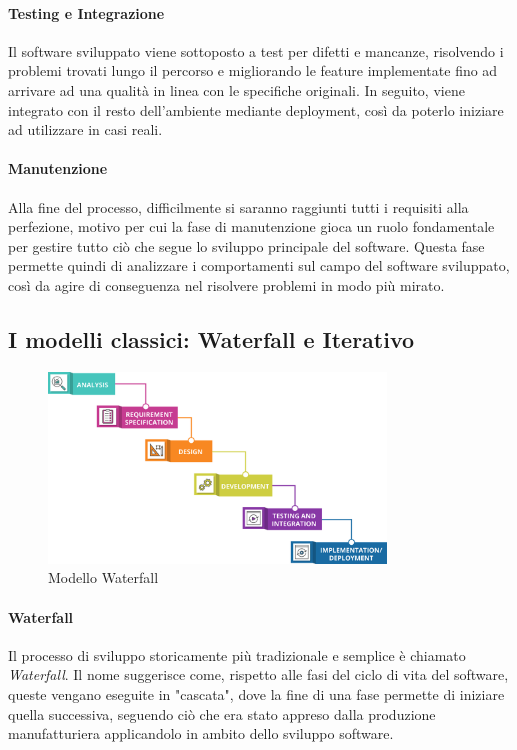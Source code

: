 \documentclass[a4paper,12pt]{report}
\begin{document}
				\paragraph{Testing e Integrazione}
				Il software sviluppato viene sottoposto a test per difetti e mancanze, risolvendo i problemi trovati lungo il percorso e migliorando
				le feature implementate fino ad arrivare ad una qualità in linea con le specifiche originali.
				In seguito, viene integrato con il resto dell'ambiente mediante deployment, così da poterlo iniziare ad utilizzare in casi reali.
				
				\paragraph{Manutenzione}
				Alla fine del processo, difficilmente si saranno raggiunti tutti i requisiti alla perfezione, motivo per cui la fase di manutenzione
				gioca un ruolo fondamentale per gestire tutto ciò che segue lo sviluppo principale del software. Questa fase permette quindi di analizzare
				i comportamenti sul campo del software sviluppato, così da agire di conseguenza nel risolvere problemi in modo più mirato.
	
			\subsection{I modelli classici: Waterfall e Iterativo}
			
				\begin{figure}[h]
					\centering
					\includegraphics[width=0.8\textwidth]{waterfall}
					\caption{Modello Waterfall}
					\label{fig:waterfall}
				\end{figure}
				
				\paragraph{Waterfall}
				Il processo di sviluppo storicamente più tradizionale e semplice è chiamato \emph{Waterfall}.
				Il nome suggerisce come, rispetto alle fasi del ciclo di vita del software, queste vengano eseguite in "cascata",
				dove la fine di una fase permette di iniziare quella successiva, seguendo ciò che era stato appreso dalla produzione
				manufatturiera applicandolo in ambito dello sviluppo software.
				
\end{document}
